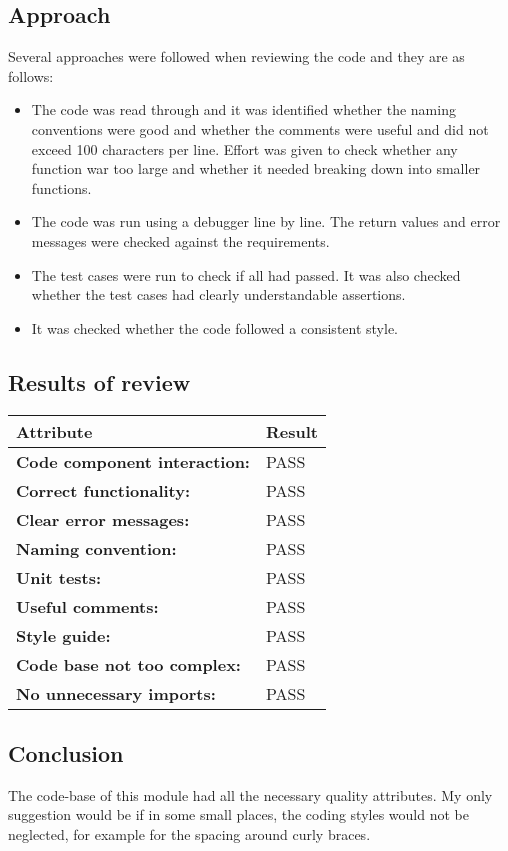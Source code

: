 \documentclass[12pt]{article}
\begin{document}
\subsection{Approach}
Several approaches were followed when reviewing the code and they are as follows:
\begin{itemize}
    \item The code was read through and it was identified whether the naming conventions were good and whether the comments were useful and did not exceed 100 characters per line. Effort was given to check whether any function war too large and whether it needed breaking down into smaller functions.
    \item The code was run using a debugger line by line. The return values and error messages were checked against the requirements.
    \item The test cases were run to check if all had passed. It was also checked whether the test cases had clearly understandable assertions. 
    \item It was checked whether the code followed a consistent style.
\end{itemize}
\subsection{Results of review}
\begin{tabular}{ |p{7cm} | p{7cm}| }
 \hline
 \textbf{Attribute} & \textbf{Result}\\
 \hline
 \textbf{Code component interaction:} & PASS\\
 \textbf{Correct functionality:} & PASS\\
 \textbf{Clear error messages:} & PASS\\
 \textbf{Naming convention:} & PASS\\
 \textbf{Unit tests:} & PASS\\
 \textbf{Useful comments:} & PASS\\
 \textbf{Style guide:} & PASS\\
 \textbf{Code base not too complex:} & PASS\\
 \textbf{No unnecessary imports:} & PASS\\
 \hline
\end{tabular}

\subsection{Conclusion}
The code-base of this module had all the necessary quality attributes. My only suggestion would be if in some small places, the coding styles would not be neglected, for example for the spacing around curly braces.
\end{document}
